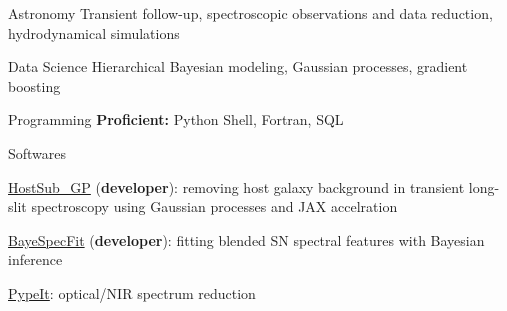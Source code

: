 


\begin{cvskills}


\cvskill
{Astronomy} %
{Transient follow-up, spectroscopic observations and data reduction, hydrodynamical simulations} %


\cvskill
{Data Science} %
{Hierarchical Bayesian modeling, Gaussian processes, gradient boosting} %


\cvskill
{Programming} %
{{\bf\color{darktext}Proficient:} Python Shell, Fortran, SQL} %



\cvskill
{Softwares} %
{\begin{cvitems}
    \item {\href{https://github.com/slowdivePTG/HostSub_GP}{HostSub\_GP} ({\bf\color{darktext}developer}): removing host galaxy background in transient long-slit spectroscopy using Gaussian processes and JAX accelration}
    \item {\href{https://github.com/slowdivePTG/BayeSpecFit}{BayeSpecFit} ({\bf\color{darktext}developer}): fitting blended SN spectral features with Bayesian inference}
    \item \href{https://pypeit.readthedocs.io/en/release/}{PypeIt}: optical/NIR spectrum reduction
\end{cvitems}}%

\end{cvskills}
